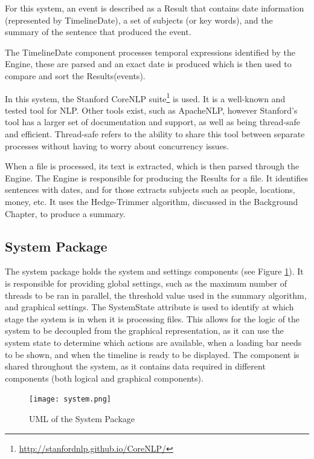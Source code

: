 \par For this system, an event is described as a Result that contains date information (represented by TimelineDate), a set of subjects (or key words), and the summary of the sentence that produced the event.
\par The TimelineDate component processes temporal expressions identified by the Engine, these are parsed and an exact date is produced which is then used to compare and sort the Results(events).
\par In this system, the Stanford CoreNLP suite\footnote{\url{http://stanfordnlp.github.io/CoreNLP/}} is used. It is a well-known and tested tool for NLP. Other tools exist, such as ApacheNLP, however Stanford's tool has a larger set of documentation and support, as well as being thread-safe and efficient. Thread-safe refers to the ability to share this tool between separate processes without having to worry about concurrency issues. 
\par When a file is processed, its text is extracted, which is then parsed through the Engine. The Engine is responsible for producing the Results for a file. It identifies sentences with dates, and for those extracts subjects such as people, locations, money, etc. It uses the Hedge-Trimmer algorithm, discussed in the Background Chapter, to produce a summary.

\subsection{System Package}
\par The system package holds the system and settings components (see Figure \ref{fig:system}). It is responsible for providing global settings, such as the maximum number of threads to be ran in parallel, the threshold value used in the summary algorithm, and graphical settings. The SystemState attribute is used to identify at which stage the system is in when it is processing files. This allows for the logic of the system to be decoupled from the graphical representation, as it can use the system state to determine which actions are available, when a loading bar needs to be shown, and when the timeline is ready to be displayed. The component is shared throughout the system, as it contains data required in different components (both logical and graphical components).
\begin{figure}[H]
\caption{UML of the System Package}
\label{fig:system}
\texttt{[image: system.png]}
\centering
\end{figure}

